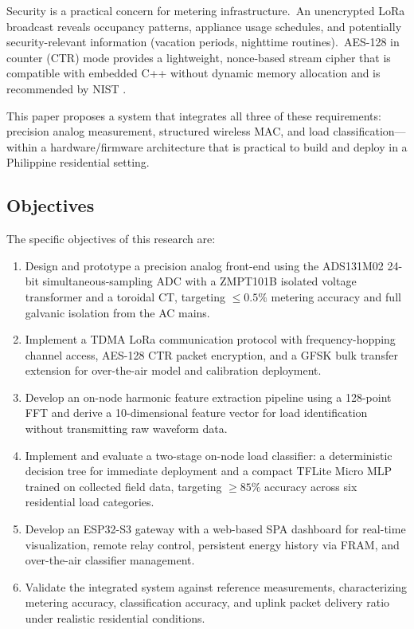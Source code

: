 \documentclass[conference]{IEEEtran}
\begin{document}
Security is a practical concern for metering infrastructure.\ An
unencrypted LoRa broadcast reveals occupancy patterns, appliance usage
schedules, and potentially security-relevant information (vacation
periods, nighttime routines).\ AES-128 in counter (CTR) mode provides
a lightweight, nonce-based stream cipher that is compatible with
embedded C++ without dynamic memory allocation and is recommended by
NIST \cite{nist_sp800_38a}.

This paper proposes a system that integrates all three of these
requirements: precision analog measurement, structured wireless MAC,
and load classification---within a hardware/firmware architecture that
is practical to build and deploy in a Philippine residential setting.

\subsection{Objectives}
\label{ssec:objectives}

The specific objectives of this research are:

\begin{enumerate}
  \item Design and prototype a precision analog front-end using the
        ADS131M02 24-bit simultaneous-sampling ADC with a ZMPT101B
        isolated voltage transformer and a toroidal CT, targeting
        \(\le 0.5\%\) metering accuracy and full galvanic isolation from
        the AC mains.

  \item Implement a TDMA LoRa communication protocol with
        frequency-hopping channel access, AES-128 CTR packet
        encryption, and a GFSK bulk transfer extension for
        over-the-air model and calibration deployment.

  \item Develop an on-node harmonic feature extraction pipeline using
        a 128-point FFT and derive a 10-dimensional feature vector
        for load identification without transmitting raw waveform data.

  \item Implement and evaluate a two-stage on-node load classifier: a
        deterministic decision tree for immediate deployment and a
        compact TFLite Micro MLP trained on collected field data,
        targeting \(\ge 85\%\) accuracy across six residential load
        categories.

  \item Develop an ESP32-S3 gateway with a web-based SPA dashboard
        for real-time visualization, remote relay control, persistent
        energy history via FRAM, and over-the-air classifier
        management.

  \item Validate the integrated system against reference measurements,
        characterizing metering accuracy, classification accuracy, and
        uplink packet delivery ratio under realistic residential
        conditions.
\end{enumerate}
\end{document}
